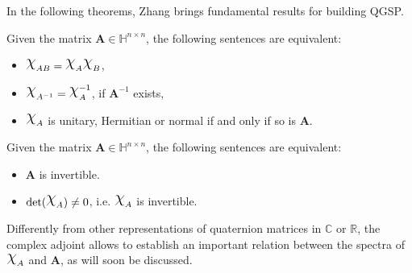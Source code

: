 In the following theorems, Zhang brings fundamental results for building QGSP.

\begin{theorem}
\label{th:equiv01}
Given the matrix $ \mathbf{A} \in \mathbb{H}^{n \times n} $, the following sentences are equivalent:

\begin{itemize}[noitemsep]
\item $ \rchi_{AB} = \rchi_{A} \rchi_{B} $,
\item $ \rchi_{A^{-1}} = \rchi_{A}^{-1}$, if $ \mathbf{A}^{-1} $ exists,
\item $ \rchi_{A}$ is unitary, Hermitian or normal if and only if so is $ \mathbf{A} $.
\end{itemize}

\end{theorem}

\begin{theorem}
\label{th:equiv02}
Given the matrix $ \mathbf{A} \in \mathbb{H}^{n \times n} $, the following sentences are equivalent:

\begin{itemize}[noitemsep]
\item $\mathbf{A}$ is invertible.
\item $\mathrm{det}(\rchi_A) \neq 0$, i.e. $\rchi_{A}$ is invertible.
\end{itemize}

\end{theorem}


Differently from other representations of quaternion matrices in $ \mathbb{C} $ or $ \mathbb{R} $, the complex adjoint allows to establish an important relation between the spectra of $ \rchi_{A} $ and $ \mathbf{A} $, as will soon be discussed.

